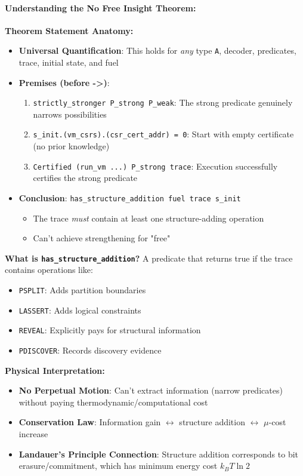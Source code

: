 \paragraph{Understanding the No Free Insight Theorem:}
\textbf{Theorem Statement Anatomy:}
\begin{itemize}
    \item \textbf{Universal Quantification}: This holds for \emph{any} type \texttt{A}, decoder, predicates, trace, initial state, and fuel
    \item \textbf{Premises (before ->)}:
    \begin{enumerate}
        \item \texttt{strictly\_stronger P\_strong P\_weak}: The strong predicate genuinely narrows possibilities
        \item \texttt{s\_init.(vm\_csrs).(csr\_cert\_addr) = 0}: Start with empty certificate (no prior knowledge)
        \item \texttt{Certified (run\_vm ...) P\_strong trace}: Execution successfully certifies the strong predicate
    \end{enumerate}
    \item \textbf{Conclusion}: \texttt{has\_structure\_addition fuel trace s\_init}
    \begin{itemize}
        \item The trace \emph{must} contain at least one structure-adding operation
        \item Can't achieve strengthening for "free"
    \end{itemize}
\end{itemize}

\textbf{What is \texttt{has\_structure\_addition}?} A predicate that returns true if the trace contains operations like:
\begin{itemize}
    \item \texttt{PSPLIT}: Adds partition boundaries
    \item \texttt{LASSERT}: Adds logical constraints
    \item \texttt{REVEAL}: Explicitly pays for structural information
    \item \texttt{PDISCOVER}: Records discovery evidence
\end{itemize}

\textbf{Physical Interpretation:}
\begin{itemize}
    \item \textbf{No Perpetual Motion}: Can't extract information (narrow predicates) without paying thermodynamic/computational cost
    \item \textbf{Conservation Law}: Information gain $\leftrightarrow$ structure addition $\leftrightarrow$ $\mu$-cost increase
    \item \textbf{Landauer's Principle Connection}: Structure addition corresponds to bit erasure/commitment, which has minimum energy cost $k_B T \ln 2$
\end{itemize}

